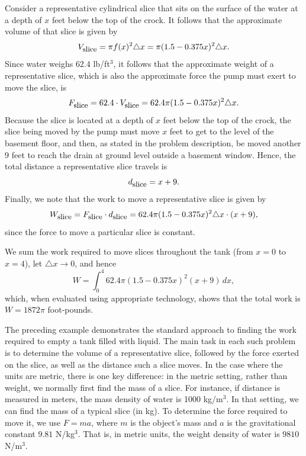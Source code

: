 Consider a representative cylindrical slice that sits on the surface of the water at a depth of $x$ feet below the top of the crock.  It follows that the approximate volume of that slice is given by 
$$V_{\mbox{\small{slice}}} = \pi f(x)^2 \triangle x = \pi (1.5 - 0.375x)^2 \triangle x.$$
Since water weighs $62.4$ lb/ft$^3$, it follows that the approximate weight of a representative slice, which is also the approximate force the pump must exert to move the slice, is
$$F_{\mbox{\small{slice}}} = 62.4 \cdot V_{\mbox{\small{slice}}} = 62.4 \pi (1.5 - 0.375x)^2 \triangle x.$$
Because the slice is located at a depth of $x$ feet below the top of the crock, the slice being moved by the pump must move $x$ feet to get to the level of the basement floor, and then, as stated in the problem description, be moved another $9$ feet to reach the drain at ground level outside a basement window.  Hence, the total distance a representative slice travels is
$$d_{\mbox{\small{slice}}} = x + 9.$$
Finally, we note that the work to move a representative slice is given by 
$$W_{\mbox{\small{slice}}} = F_{\mbox{\small{slice}}} \cdot d_{\mbox{\small{slice}}} = 62.4 \pi (1.5 - 0.375x)^2 \triangle x \cdot (x+9),$$
since the force to move a particular slice is constant.

We sum the work required to move slices throughout the tank (from $x = 0$ to $x = 4$), let $\triangle x \to 0$, and hence 
$$W = \int_0^4 62.4 \pi (1.5 - 0.375x)^2 (x+9) \, dx,$$
which, when evaluated using appropriate technology, shows that the total work is $W = 1872\pi$ foot-pounds.

The preceding example demonstrates the standard approach to finding the work required to empty a tank filled with liquid.  The main task in each such problem is to determine the volume of a representative slice, followed by the force exerted on the slice, as well as the distance such a slice moves.  In the case where the units are metric, there is one key difference:  in the metric setting, rather than weight, we normally first find the mass of a slice.  For instance, if distance is measured in meters, the mass density of water is 1000 kg/m$^3$.  In that setting, we can find the mass of a typical slice (in kg).  To determine the force required to move it, we use $F = ma$, where $m$ is the object's mass and $a$ is the gravitational constant $9.81$ N/kg$^3$.  That is, in metric units, the weight density of water is $9810$ N/m$^3$.



